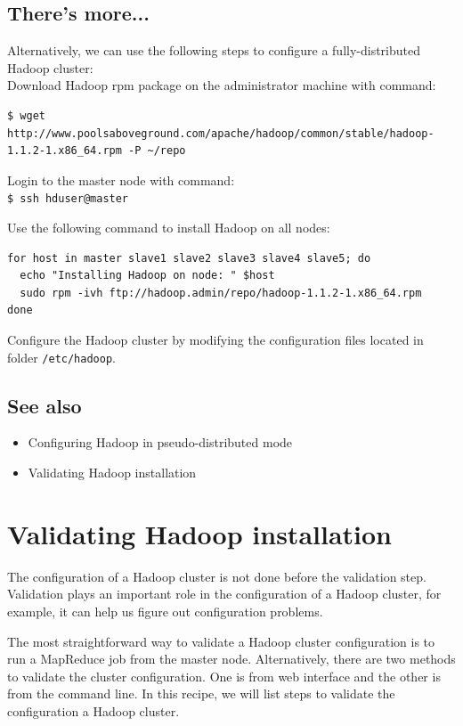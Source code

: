 \subsection*{There's more...}
Alternatively, we can use the following steps to configure a fully-distributed Hadoop cluster: \\
Download Hadoop rpm package on the administrator machine with command:
\lstset{style=bashstyle}
\begin{lstlisting}
$ wget http://www.poolsaboveground.com/apache/hadoop/common/stable/hadoop-1.1.2-1.x86_64.rpm -P ~/repo
\end{lstlisting}

Login to the master node with command: \\
\verb|$ ssh hduser@master|

Use the following command to install Hadoop on all nodes:
\lstset{style=bashstyle}
\begin{lstlisting}
for host in master slave1 slave2 slave3 slave4 slave5; do
  echo "Installing Hadoop on node: " $host
  sudo rpm -ivh ftp://hadoop.admin/repo/hadoop-1.1.2-1.x86_64.rpm
done
\end{lstlisting}

Configure the Hadoop cluster by modifying the configuration files located in folder \verb|/etc/hadoop|. \\
\subsection*{See also}
\begin{itemize}
  \item Configuring Hadoop in pseudo-distributed mode
  \item Validating Hadoop installation
\end{itemize}

\section{Validating Hadoop installation}
The configuration of a Hadoop cluster is not done before the validation step. Validation plays an important role in the configuration of a Hadoop cluster, for example, it can help us figure out configuration problems.

The most straightforward way to validate a Hadoop cluster configuration is to run a MapReduce job from the master node. Alternatively, there are two methods to validate the cluster configuration. One is from web interface and the other is from the command line. In this recipe, we will list steps to validate the configuration a Hadoop cluster.
